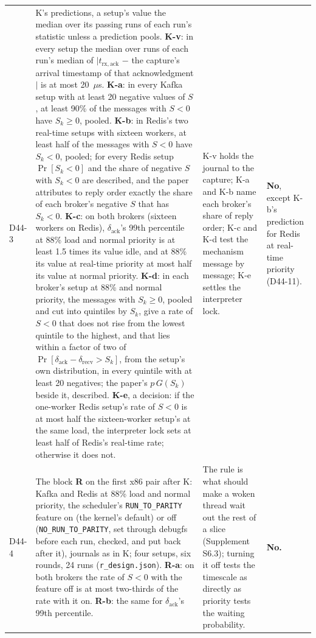 \documentclass[11pt]{article}
\begin{document}
{\begin{longtable}{@{}p{1.1cm} >{\raggedright\arraybackslash}p{6.1cm} >{\raggedright\arraybackslash}p{6.0cm} >{\raggedright\arraybackslash}p{2.2cm}@{}}
D44-3 & K's predictions, a setup's value the median over its passing runs of each run's statistic unless a prediction pools. \textbf{K-v}: in every setup the median over runs of each run's median of $|t_{\mathrm{rx,ack}}$ $-$ the capture's arrival timestamp of that acknowledgment$|$ is at most 20~$\mu$s. \textbf{K-a}: in every Kafka setup with at least 20 negative values of $S$, at least 90\% of the messages with $S < 0$ have $S_k \geq 0$, pooled. \textbf{K-b}: in Redis's two real-time setups with sixteen workers, at least half of the messages with $S < 0$ have $S_k < 0$, pooled; for every Redis setup $\Pr[S_k < 0]$ and the share of negative $S$ with $S_k < 0$ are described, and the paper attributes to reply order exactly the share of each broker's negative $S$ that has $S_k < 0$. \textbf{K-c}: on both brokers (sixteen workers on Redis), $\delta_{\mathrm{ack}}$'s 99th percentile at 88\% load and normal priority is at least 1.5 times its value idle, and at 88\% its value at real-time priority at most half its value at normal priority. \textbf{K-d}: in each broker's setup at 88\% and normal priority, the messages with $S_k \geq 0$, pooled and cut into quintiles by $S_k$, give a rate of $S < 0$ that does not rise from the lowest quintile to the highest, and that lies within a factor of two of $\Pr[\delta_{\mathrm{ack}} - \delta_{\mathrm{recv}} > S_k]$, from the setup's own distribution, in every quintile with at least 20 negatives; the paper's $p\,G(S_k)$ beside it, described. \textbf{K-e}, a decision: if the one-worker Redis setup's rate of $S < 0$ is at most half the sixteen-worker setup's at the same load, the interpreter lock sets at least half of Redis's real-time rate; otherwise it does not. & K-v holds the journal to the capture; K-a and K-b name each broker's share of reply order; K-c and K-d test the mechanism message by message; K-e settles the interpreter lock. & \textbf{No}, except K-b's prediction for Redis at real-time priority (D44-11). \\
D44-4 & The block \textbf{R} on the first x86 pair after K: Kafka and Redis at 88\% load and normal priority, the scheduler's \texttt{RUN\_TO\_PARITY} feature on (the kernel's default) or off (\texttt{NO\_RUN\_TO\_PARITY}, set through debugfs before each run, checked, and put back after it), journals as in K; four setups, six rounds, 24 runs (\texttt{r\_design.json}). \textbf{R-a}: on both brokers the rate of $S < 0$ with the feature off is at most two-thirds of the rate with it on. \textbf{R-b}: the same for $\delta_{\mathrm{ack}}$'s 99th percentile. & The rule is what should make a woken thread wait out the rest of a slice (Supplement S6.3); turning it off tests the timescale as directly as priority tests the waiting probability. & \textbf{No.} \\

\end{longtable}}
\end{document}
